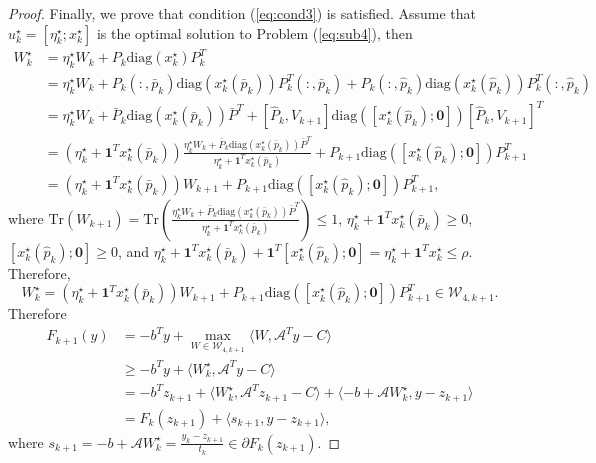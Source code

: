 \documentclass{jcmlatex}
\begin{document}
\begin{proof}
Finally, we prove that condition (\ref{eq:cond3}) is satisfied. Assume that \(u_{k}^{\star}=[\eta_{k}^{\star};x_{k}^{\star}]\) is the optimal solution to Problem (\ref{eq:sub4}), then
\begin{equation*}
\begin{aligned}
W_{k}^{\star} &= \eta_{k}^{\star}W_{k} + P_{k}\text{diag}(x_{k}^{\star})P_{k}^{T} \\ 
&= \eta_{k}^{\star}W_{k} + P_{k}(:,\bar{p}_{k})\text{diag}(x_{k}^{\star}(\bar{p}_{k}))P_{k}^{T}(:,\bar{p}_{k}) + P_{k}(:,\hat{p}_{k})\text{diag}(x_{k}^{\star}(\hat{p}_{k}))P_{k}^{T}(:,\hat{p}_{k}) \\
&= \eta_{k}^{\star}W_{k} + \bar{P}_{k}\text{diag}(x_{k}^{\star}(\bar{p}_{k}))\bar{P}^{T} + [\hat{P}_{k},V_{k+1}]\text{diag}([x_{k}^{\star}(\hat{p}_{k});\textbf{0}])[\hat{P}_{k},V_{k+1}]^{T} \\ 
&= (\eta_{k}^{\star} + \textbf{1}^{T}x_{k}^{\star}(\bar{p}_{k}))\frac{\eta_{k}^{\star}W_{k} + \bar{P}_{k}\text{diag}(x_{k}^{\star}(\bar{p}_{k}))\bar{P}^{T}}{\eta_{k}^{\star} + \textbf{1}^{T}x_{k}^{\star}(\bar{p}_{k})} + P_{k+1}\text{diag}([x_{k}^{\star}(\hat{p}_{k});\textbf{0}])P_{k+1}^{T} \\ 
&= (\eta_{k}^{\star} + \textbf{1}^{T}x_{k}^{\star}(\bar{p}_{k}))W_{k+1} + P_{k+1}\text{diag}([x_{k}^{\star}(\hat{p}_{k});\textbf{0}])P_{k+1}^{T},
\end{aligned}
\end{equation*}
where \(\text{Tr}(W_{k+1})=\text{Tr}(\frac{\eta_{k}^{\star}W_{k} + \bar{P}_{k}\text{diag}(x_{k}^{\star}(\bar{p}_{k}))\bar{P}^{T}}{\eta_{k}^{\star} + \textbf{1}^{T}x_{k}^{\star}(\bar{p}_{k})}) \leq 1\), \(\eta_{k}^{\star} + \textbf{1}^{T}x_{k}^{\star}(\bar{p}_{k}) \geq 0\), \([x_{k}^{\star}(\hat{p}_{k});\textbf{0}] \geq 0\), and \(\eta_{k}^{\star} + \textbf{1}^{T}x_{k}^{\star}(\bar{p}_{k}) + \textbf{1}^{T}[x_{k}^{\star}(\hat{p}_{k});\textbf{0}] = \eta_{k}^{\star} + \textbf{1}^{T}x_{k}^{\star} \leq \rho\). Therefore,
\begin{equation*}
W_{k}^{\star} = (\eta_{k}^{\star} + \textbf{1}^{T}x_{k}^{\star}(\bar{p}_{k}))W_{k+1} + P_{k+1}\text{diag}([x_{k}^{\star}(\hat{p}_{k});\textbf{0}])P_{k+1}^{T} \in \mathcal{W}_{4,k+1}.
\end{equation*}
Therefore 
\begin{equation*}
\begin{aligned}
F_{k+1}(y)&=-b^{T}y+\underset{W\in \mathcal{W}_{4,k+1}}{\max}\langle W, \mathcal{A}^{T}y-C\rangle\\ 
&\geq -b^{T}y+\langle W_{k}^{\star}, \mathcal{A}^{T}y-C\rangle\\
&=-b^{T}z_{k+1}+\langle W_{k}^{\star}, \mathcal{A}^{T}z_{k+1}-C\rangle+\langle -b+\mathcal{A}W_{k}^{\star}, y-z_{k+1}\rangle\\
&=F_{k}(z_{k+1})+\langle s_{k+1}, y-z_{k+1}\rangle,
\end{aligned}
\end{equation*}
where \(s_{k+1}=-b+\mathcal{A}W_{k}^{\star}=\frac{y_{k}-z_{k+1}}{t_{k}}\in \partial F_{k}(z_{k+1})\).
\hfill\fbox{\rule{0pt}{0.42mm}\rule{0.42mm}{0pt}}
\end{proof}
\end{document}
